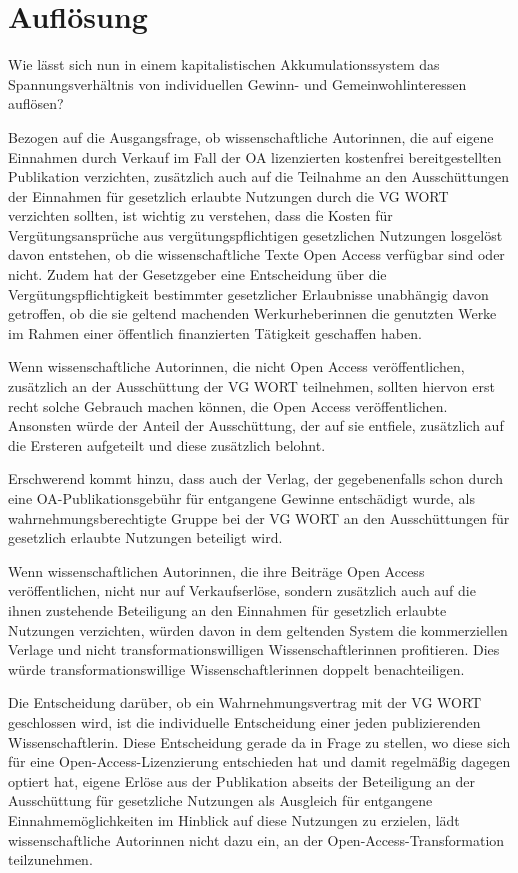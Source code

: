 \documentclass[a4paper,
fontsize=11pt,
oneside,
numbers=noperiodatend,
parskip=half-,
bibliography=totoc,
final
]{scrartcl}
\begin{document}
\hypertarget{aufluxf6sung}{%
\section{Auflösung}\label{aufluxf6sung}}

Wie lässt sich nun in einem kapitalistischen Akkumulationssystem das
Spannungsverhältnis von individuellen Gewinn- und Gemeinwohlinteressen
auflösen?

Bezogen auf die Ausgangsfrage, ob wissenschaftliche Autorinnen, die auf
eigene Einnahmen durch Verkauf im Fall der OA lizenzierten kostenfrei
bereitgestellten Publikation verzichten, zusätzlich auch auf die
Teilnahme an den Ausschüttungen der Einnahmen für gesetzlich erlaubte
Nutzungen durch die VG WORT verzichten sollten, ist wichtig zu
verstehen, dass die Kosten für Vergütungsansprüche aus
vergütungspflichtigen gesetzlichen Nutzungen losgelöst davon entstehen,
ob die wissenschaftliche Texte Open Access verfügbar sind oder nicht.
Zudem hat der Gesetzgeber eine Entscheidung über die
Vergütungspflichtigkeit bestimmter gesetzlicher Erlaubnisse unabhängig
davon getroffen, ob die sie geltend machenden Werkurheberinnen die
genutzten Werke im Rahmen einer öffentlich finanzierten Tätigkeit
geschaffen haben.

Wenn wissenschaftliche Autorinnen, die nicht Open Access
veröffentlichen, zusätzlich an der Ausschüttung der VG WORT teilnehmen,
sollten hiervon erst recht solche Gebrauch machen können, die Open
Access veröffentlichen. Ansonsten würde der Anteil der Ausschüttung, der
auf sie entfiele, zusätzlich auf die Ersteren aufgeteilt und diese
zusätzlich belohnt.

Erschwerend kommt hinzu, dass auch der Verlag, der gegebenenfalls schon
durch eine OA-Publikationsgebühr für entgangene Gewinne entschädigt
wurde, als wahrnehmungsberechtigte Gruppe bei der VG WORT an den
Ausschüttungen für gesetzlich erlaubte Nutzungen beteiligt wird.

Wenn wissenschaftlichen Autorinnen, die ihre Beiträge Open Access
veröffentlichen, nicht nur auf Verkaufserlöse, sondern zusätzlich auch
auf die ihnen zustehende Beteiligung an den Einnahmen für gesetzlich
erlaubte Nutzungen verzichten, würden davon in dem geltenden System die
kommerziellen Verlage und nicht transformationswilligen
Wissenschaftlerinnen profitieren. Dies würde transformationswillige
Wissenschaftlerinnen doppelt benachteiligen.

Die Entscheidung darüber, ob ein Wahrnehmungsvertrag mit der VG WORT
geschlossen wird, ist die individuelle Entscheidung einer jeden
publizierenden Wissenschaftlerin. Diese Entscheidung gerade da in Frage
zu stellen, wo diese sich für eine Open-Access-Lizenzierung entschieden
hat und damit regelmäßig dagegen optiert hat, eigene Erlöse aus der
Publikation abseits der Beteiligung an der Ausschüttung für gesetzliche
Nutzungen als Ausgleich für entgangene Einnahmemöglichkeiten im Hinblick
auf diese Nutzungen zu erzielen, lädt wissenschaftliche Autorinnen nicht
dazu ein, an der Open-Access-Transformation teilzunehmen.
\end{document}
